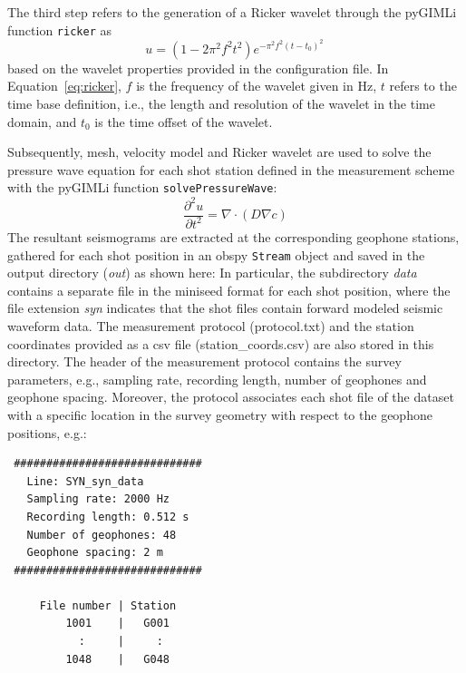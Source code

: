 \documentclass[a4paper,fleqn]{cas-sc}
\begin{document}
The third step refers to the generation of a Ricker wavelet through the pyGIMLi function \texttt{ricker} as
\begin{equation}
	u = \left(1-2\pi^2f^2t^2\right)e^{-\pi^2f^2\left(t-t_0\right)^2}\,
	\label{eq:ricker}
\end{equation}
based on the wavelet properties provided in the configuration file. In Equation~\ref{eq:ricker}, $f$ is the frequency of the wavelet given in \unit{Hz}, $t$ refers to the time base definition, i.e., the length and resolution of the wavelet in the time domain, and $t_0$ is the time offset of the wavelet.

Subsequently, mesh, velocity model and Ricker wavelet are used to solve the pressure wave equation for each shot station defined in the measurement scheme with the pyGIMLi function \texttt{solvePressureWave}:
\begin{equation}
	\frac{\partial^2u}{\partial t^2}=\nabla\cdot\left(D\nabla c\right)
\end{equation}
The resultant seismograms are extracted at the corresponding geophone stations, gathered for each shot position in an obspy \texttt{Stream} object and saved in the output directory (\textit{out}) as shown here:
In particular, the subdirectory \textit{data} contains a separate file in the miniseed format \citep{ahern2012, ringler2015} for each shot position, where the file extension \textit{syn} indicates that the shot files contain forward modeled seismic waveform data. 
The measurement protocol (protocol.txt) and the station coordinates provided as a csv file (station\_coords.csv) are also stored in this directory. The header of the measurement protocol contains the survey parameters, e.g., sampling rate, recording length, number of geophones and geophone spacing. Moreover, the protocol associates each shot file of the dataset with a specific location in the survey geometry with respect to the geophone positions, e.g.:
\begin{footnotesize}
\begin{verbatim}
 #############################
   Line: SYN_syn_data             
   Sampling rate: 2000 Hz    
   Recording length: 0.512 s 
   Number of geophones: 48   
   Geophone spacing: 2 m     
 #############################
 
     File number | Station
         1001    |   G001
           :     |     :
         1048    |   G048
\end{verbatim}
\end{footnotesize}
\end{document}

